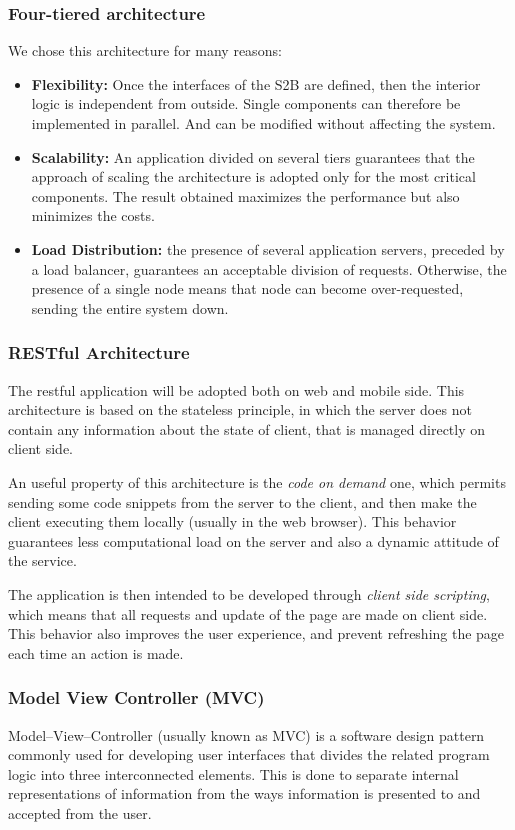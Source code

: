 \subsubsection{Four-tiered architecture}
We chose this architecture for many reasons:
\begin{itemize}
    \item \textbf{Flexibility:} Once the interfaces of the S2B are defined, then the interior logic is independent from outside. Single components can therefore be implemented in parallel. And can be modified without affecting the system.
    \item \textbf{Scalability:} An application divided on several tiers guarantees that the approach of scaling the architecture is adopted only for the most critical components. The result obtained maximizes the performance but also minimizes the costs.
    \item \textbf{Load Distribution:} the presence of several application servers, preceded by a load balancer, guarantees an acceptable division of requests. Otherwise, the presence of a single node means that node can become over-requested, sending the entire system down.
\end{itemize}

\subsubsection{RESTful Architecture}
\label{REST}
The restful application will be adopted both on web and mobile side. This architecture is based on the stateless principle, in which the server does not contain any information about the state of client, that is managed directly on client side.

An useful property of this architecture is the \textit{code on demand} one, which permits sending some code snippets from the server to the client, and then make the client executing them locally (usually in the web browser). This behavior guarantees less computational load on the server and also a dynamic attitude of the service.

The application is then intended to be developed through \textit{client side scripting}, which means that all requests and update of the page are made on client side. This behavior also improves the user experience, and prevent refreshing the page each time an action is made.

\subsubsection{Model View Controller (MVC)}
Model--View--Controller (usually known as MVC) is a software design pattern commonly used for developing user interfaces that divides the related program logic into three interconnected elements. This is done to separate internal representations of information from the ways information is presented to and accepted from the user.

